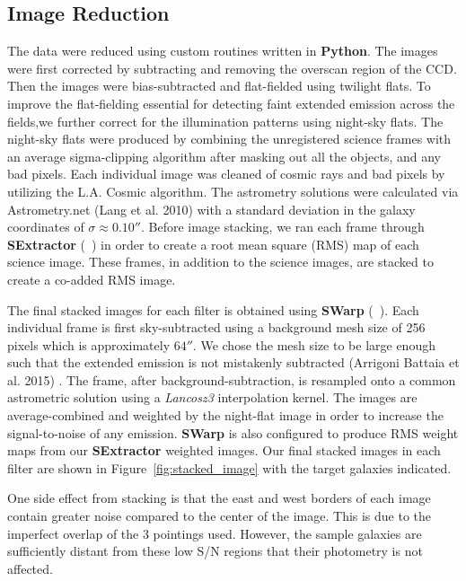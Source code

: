 \documentclass[twocolumn]{aastex61}
\newcommand{\citeth}[1]{(\citeauthor{#1}\ \citeyear{#1})}
\begin{document}
\subsection{Image Reduction}
The data were reduced using custom routines written in \textbf{Python}. 
The images were first corrected by subtracting and removing the overscan region of the CCD. 
Then the images were bias-subtracted and flat-fielded using twilight flats.
To improve the flat-fielding essential for detecting faint extended emission across the fields,we further correct for the illumination patterns using night-sky flats. The night-sky flats were produced by combining the unregistered science frames with an average sigma-clipping algorithm after masking out all the objects, and any bad pixels. Each individual image was cleaned of cosmic rays and bad pixels by utilizing the L.A. Cosmic algorithm.
The astrometry solutions were calculated via Astrometry.net (Lang et al. 2010)\nocite{Lang} with a standard deviation in the galaxy coordinates of $\sigma \approx 0.10''$. Before image stacking, we ran each frame through \textbf{SExtractor} \citeth{Bertin} in order to create a root mean square (RMS) map of each science image.
These frames, in addition to the science images, are stacked to create a co-added RMS image.

The final stacked images for each filter is obtained using \textbf{SWarp} \citeth{Bertin}.
Each individual frame is first sky-subtracted using a background mesh size of 256 pixels which is approximately $64''$. 
We chose the mesh size to be large enough such that the extended emission is not mistakenly subtracted (Arrigoni Battaia et al. 2015) \nocite{Battaia_2015}. 
The frame, after background-subtraction, is resampled onto a common astrometric solution using a \textit{Lancosz3} interpolation kernel. 
The images are average-combined and weighted by the night-flat image in order to increase the signal-to-noise of any  emission. \textbf{SWarp} is also configured to produce RMS weight maps from our \textbf{SExtractor} weighted images. Our final stacked images in each filter are shown in Figure~\ref{fig:stacked_image} with the target galaxies indicated.  

One side effect from stacking is that the east and west borders of each image contain greater noise compared to the center of the image. This is due to the imperfect overlap of the 3 pointings used. However, the sample galaxies are sufficiently distant from these low S/N regions that their photometry is not affected.
\end{document}
